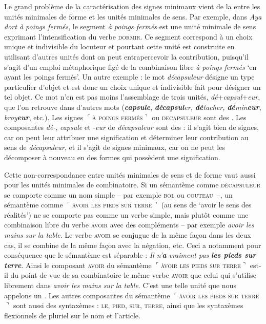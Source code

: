Le grand problème de la caractérisation des signes minimaux vient de la  entre les unités minimales de forme et les unités minimales de sens. Par exemple, dans \textit{Aya dort à poings fermés}, le segment \textit{à poings fermés} est une unité minimale de sens exprimant l’intensification du verbe \textsc{dormir}. Ce segment correspond à un choix unique et indivisible du locuteur et pourtant cette unité est construite en utilisant d’autres unités dont on peut entrapercevoir la contribution, puisqu’il s’agit d’un emploi métaphorique figé de la combinaison libre \textit{à poings fermés} ‘en ayant les poings fermés’. Un autre exemple : le mot \textit{décapsuleur} désigne un type particulier d’objet et est donc un choix unique et indivisible fait pour désigner un tel objet. Ce mot n’en est pas moins l’assemblage de trois unités, \textit{dé}+\textit{capsul}+\textit{eur}, que l’on retrouve dans d’autres mots (\textbf{\textit{capsule}}, \textbf{\textit{décapsul}}\textit{er,} \textbf{\textit{dé}}\textit{tacher,} \textbf{\textit{dé}}\textit{min}\textbf{\textit{eur}}, \textit{broy}\textit{\textbf{eur}}, etc.). Les signes $⌜$\textsc{à} \textsc{poings} \textsc{fermés}$⌝$ ou \textsc{decapsuleur} sont des . Les composantes \textit{dé-}, \textit{capsule} et -\textit{eur} de \textit{décapsuleur} sont des : il s’agit bien de signes, car on peut leur attribuer une signification et déterminer leur contribution au sens de \textit{décapsuleur}, et il s’agit de signes minimaux, car on ne peut les décomposer à nouveau en des formes qui possèdent une signification.

Cette non-correspondance entre unités minimales de sens et de forme vaut aussi pour les unités minimales de combinatoire. Si un sémantème comme \textsc{décapsuleur} se comporte comme un nom simple – par exemple \textsc{bol} ou \textsc{couteau}~–, un sémantème comme $⌜$\textsc{àvoir} \textsc{les} \textsc{pieds} \textsc{sur} \textsc{terre}$⌝$ (au sens de ‘avoir le sens des réalités’) ne se comporte pas comme un verbe simple, mais plutôt comme une combinaison libre du verbe \textsc{avoir} avec des compléments – par exemple \textit{avoir les mains sur la table}. Le verbe \textsc{avoir} se conjugue de la même façon dans les deux cas, il se combine de la même façon avec la négation, etc. Ceci a notamment pour conséquence que le sémantème est séparable : \textit{Il n’}\textbf{\textit{a}} \textit{vraiment pas} \textbf{\textit{les pieds sur terre}}. Ainsi le composant \textsc{avoir} du sémantème $⌜$\textsc{àvoir} \textsc{les} \textsc{pieds} \textsc{sur} \textsc{terre}$⌝$ est-il du point de vue de sa combinatoire le même verbe \textsc{avoir} que celui qui s’utilise librement dans \textit{avoir les mains sur la table}. C’est une telle unité que nous appelons un . Les autres composantes du sémantème $⌜$\textsc{àvoir} \textsc{les} \textsc{pieds} \textsc{sur} \textsc{terre}$⌝$ sont aussi des syntaxèmes : \textsc{le,} \textsc{pied,} \textsc{sur,} \textsc{terre}, ainsi que les syntaxèmes flexionnels de pluriel sur le nom et l'article.

